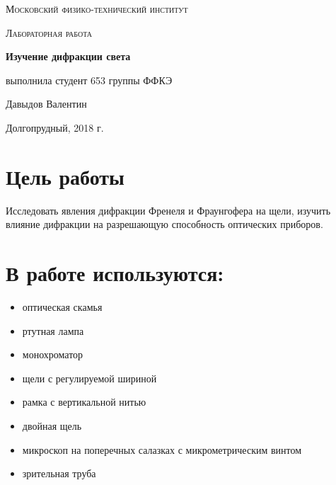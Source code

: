 \documentclass[a4paper]{article}
\begin{document}
\begin{titlepage}
	\centering
	\vspace{5cm}
	{\scshape\LARGE Московский физико-технический институт \par}
	\vspace{4cm}
	{\scshape\Large Лабораторная работа \par}
	\vspace{1cm}
	{\huge\bfseries Изучение дифракции света \par}
	\vspace{1cm}
	\vfill
\begin{flushright}
	{\large выполнила студент 653 группы ФФКЭ}\par
	\vspace{0.3cm}
	{\LARGE Давыдов Валентин}
\end{flushright}
	

	\vfill

	Долгопрудный, 2018 г.
\end{titlepage}

\section{Цель работы}
Исследовать явления дифракции Френеля и Фраунгофера на щели, изучить влияние дифракции на разрешающую способность оптических приборов.

\section{В работе используются:}
\begin{itemize}
    \item оптическая скамья
    \item ртутная лампа
    \item монохроматор
    \item щели с регулируемой шириной
    \item рамка с вертикальной нитью
    \item двойная щель
    \item микроскоп на поперечных салазках с микрометрическим винтом
    \item зрительная труба
\end{itemize}
\end{document}
